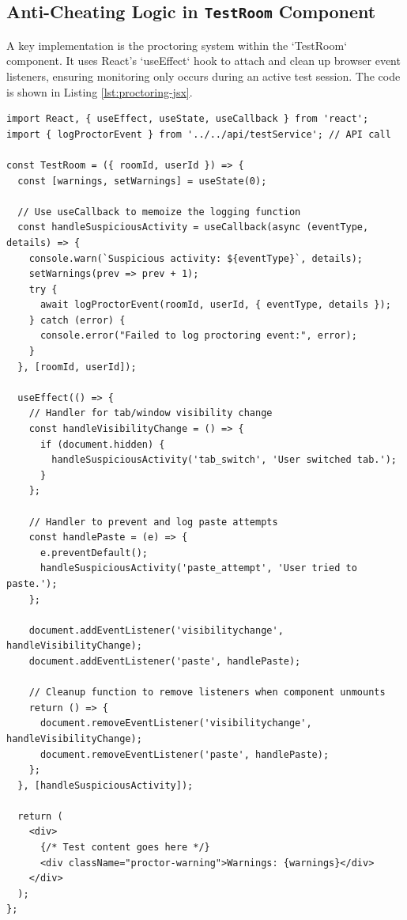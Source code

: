 \subsection{Anti-Cheating Logic in \texttt{TestRoom} Component}
A key implementation is the proctoring system within the `TestRoom` component. It uses React's `useEffect` hook to attach and clean up browser event listeners, ensuring monitoring only occurs during an active test session. The code is shown in Listing \ref{lst:proctoring-jsx}.
\FloatBarrier
\begin{lstlisting}[language=JSX, caption={Simplified anti-cheating logic in the `TestRoom` React component.}, label={lst:proctoring-jsx}]
import React, { useEffect, useState, useCallback } from 'react';
import { logProctorEvent } from '../../api/testService'; // API call

const TestRoom = ({ roomId, userId }) => {
  const [warnings, setWarnings] = useState(0);

  // Use useCallback to memoize the logging function
  const handleSuspiciousActivity = useCallback(async (eventType, details) => {
    console.warn(`Suspicious activity: ${eventType}`, details);
    setWarnings(prev => prev + 1);
    try {
      await logProctorEvent(roomId, userId, { eventType, details });
    } catch (error) {
      console.error("Failed to log proctoring event:", error);
    }
  }, [roomId, userId]);

  useEffect(() => {
    // Handler for tab/window visibility change
    const handleVisibilityChange = () => {
      if (document.hidden) {
        handleSuspiciousActivity('tab_switch', 'User switched tab.');
      }
    };

    // Handler to prevent and log paste attempts
    const handlePaste = (e) => {
      e.preventDefault();
      handleSuspiciousActivity('paste_attempt', 'User tried to paste.');
    };
    
    document.addEventListener('visibilitychange', handleVisibilityChange);
    document.addEventListener('paste', handlePaste);

    // Cleanup function to remove listeners when component unmounts
    return () => {
      document.removeEventListener('visibilitychange', handleVisibilityChange);
      document.removeEventListener('paste', handlePaste);
    };
  }, [handleSuspiciousActivity]);

  return (
    <div>
      {/* Test content goes here */}
      <div className="proctor-warning">Warnings: {warnings}</div>
    </div>
  );
};
\end{lstlisting}


